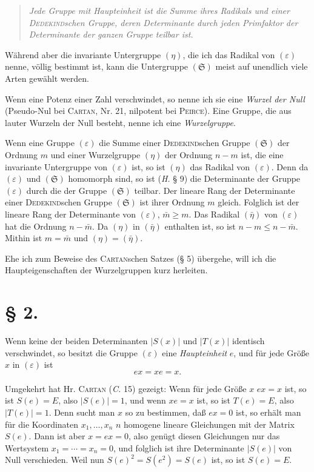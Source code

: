 \documentclass[11pt]{article}
\newcommand{\eps}{\varepsilon}
\newcommand{\grS}{\mathfrak{S}}
\begin{document}
\begin{quote}\itshape
Jede Gruppe mit Haupteinheit ist die Summe ihres Radikals und einer {\normalfont\textsc{Dedekind}}schen Gruppe, deren Determinante durch jeden Primfaktor der Determinante der ganzen Gruppe teilbar ist.
\end{quote}

Während aber die invariante Untergruppe $(\eta)$, die ich das Radikal von $(\eps)$ nenne, völlig bestimmt ist, kann die Untergruppe $(\grS)$ meist auf unendlich viele Arten gewählt werden.

Wenn eine Potenz einer Zahl verschwindet, so nenne ich sie eine \emph{Wurzel der Null} (Pseudo-Nul bei \textsc{Cartan}, Nr. 21, nilpotent bei \textsc{Peirce}). Eine Gruppe, die aus lauter Wurzeln der Null besteht, nenne ich eine \emph{Wurzelgruppe}.

Wenn eine Gruppe $(\eps)$ die Summe einer \textsc{Dedekind}schen Gruppe $(\grS)$ der Ordnung $m$ und einer Wurzelgruppe $(\eta)$ der Ordnung $n-m$ ist, die eine invariante Untergruppe von $(\eps)$ ist, so ist $(\eta)$ das Radikal von $(\eps)$. Denn da $(\eps)$ und $(\grS)$ homomorph sind, so ist (\emph{H.} § 9) die Determinante der Gruppe $(\eps)$ durch die der Gruppe $(\grS)$ teilbar. Der lineare Rang der Determinante einer \textsc{Dedekind}schen Gruppe $(\grS)$ ist ihrer Ordnung $m$ gleich. Folglich ist der lineare Rang der Determinante von $(\eps)$, $\bar m\geq m$. Das Radikal $(\bar\eta)$ von $(\eps)$ hat die Ordnung $n-\bar m$. Da $(\eta)$ in $(\bar\eta)$ enthalten ist, so ist $n-m\leq n-\bar m$. Mithin ist $m=\bar m$ und $(\eta)=(\bar\eta)$.

Ehe ich zum Beweise des \textsc{Cartan}schen Satzes (§ 5) übergehe, will ich die Haupteigenschaften der Wurzelgruppen kurz herleiten.

\section*{§ 2.}

Wenn keine der beiden Determinanten $|S(x)|$ und $|T(x)|$ identisch verschwindet, so besitzt die Gruppe $(\eps)$ eine \emph{Haupteinheit} $e$, und für jede Größe $x$ in $(\eps)$ ist
\begin{equation}\tag{1.}
 ex=xe=x.
\end{equation}

Umgekehrt hat Hr. \textsc{Cartan} (\emph{C.} 15) gezeigt: Wenn für jede Größe $x$ $ex=x$ ist, so ist $S(e)=E$, also $|S(e)|=1$, und wenn $xe=x$ ist, so ist $T(e)=E$, also $|T(e)|=1$. Denn sucht man $x$ so zu bestimmen, daß $ex=0$ ist, so erhält man für die Koordinaten $x_1,\ldots,x_n$ $n$ homogene lineare Gleichungen mit der Matrix $S(e)$. Dann ist aber $x=ex=0$, also genügt diesen Gleichungen nur das Wertsystem $x_1=\cdots=x_n=0$, und folglich ist ihre Determinante $|S(e)|$ von Null verschieden. Weil nun $S(e)^2=S(e^2)=S(e)$ ist, so ist $S(e)=E$.
\end{document}
